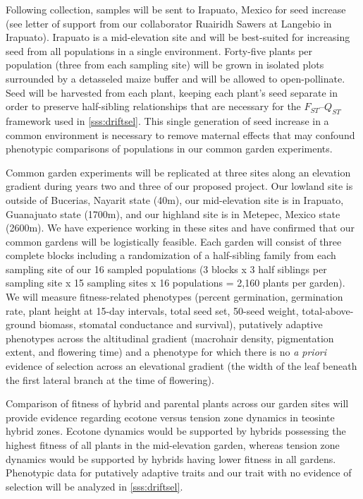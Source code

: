 Following collection, samples will be sent to Irapuato, Mexico for seed increase (see letter of support from our collaborator Ruairidh Sawers at Langebio in Irapuato).
Irapuato is a mid-elevation site and will be best-suited for increasing seed from all populations in a single environment.
Forty-five plants per population (three from each sampling site) will be grown in isolated plots surrounded by a detasseled maize buffer and will be allowed to open-pollinate.
Seed will be harvested from each plant, keeping each plant's seed separate in order to preserve half-sibling relationships that are necessary for the $F_{ST}$--$Q_{ST}$ framework used in \ref{sss:driftsel}.
This single generation of seed increase in a common environment is necessary to remove maternal effects that may confound phenotypic comparisons of populations in our common garden experiments.

Common garden experiments will be replicated at three sites along an elevation gradient during years two and three of our proposed project.
Our lowland site is outside of Bucerias, Nayarit state (40m), our mid-elevation site is in Irapuato, Guanajuato state (1700m), and our highland site is in Metepec, Mexico state (2600m).
We have experience working in these sites and have confirmed that our common gardens will be logistically feasible.
Each garden will consist of three complete blocks including a randomization of a half-sibling family from each sampling site of our 16 sampled populations (3 blocks x 3 half siblings per sampling site x 15 sampling sites x 16 populations = 2,160 plants per garden).  
We will measure fitness-related phenotypes (percent germination, germination rate, plant height at 15-day intervals, total seed set, 50-seed weight, total-above-ground biomass, stomatal conductance and survival), putatively adaptive phenotypes across the altitudinal gradient (macrohair density, pigmentation extent, and flowering time) and a phenotype for which there is no \emph{a priori} evidence of selection across an elevational gradient (the width of the leaf beneath the first lateral branch at the time of flowering).  

Comparison of fitness of hybrid and parental plants across our garden sites will provide evidence regarding ecotone versus tension zone dynamics in teosinte hybrid zones.  Ecotone dynamics would be supported by hybrids possessing the highest fitness of all plants in the mid-elevation garden, whereas tension zone dynamics would be supported by hybrids having lower fitness in all gardens.
Phenotypic data for putatively adaptive traits and our trait with no evidence of selection will be analyzed in \ref{sss:driftsel}.

